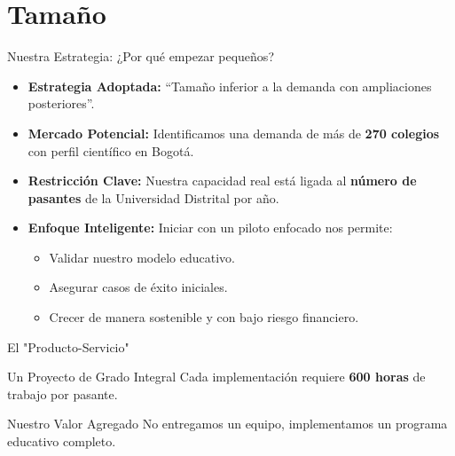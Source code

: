 \section{Tamaño}

\begin{frame}{Nuestra Estrategia: ¿Por qué empezar pequeños?}
    \begin{itemize}
        \item \textbf{Estrategia Adoptada:} ``Tamaño inferior a la demanda con ampliaciones posteriores''.
        \item \textbf{Mercado Potencial:} Identificamos una demanda de más de \textbf{270 colegios} con perfil científico en Bogotá.
        \item \textbf{Restricción Clave:} Nuestra capacidad real está ligada al \textbf{número de pasantes} de la Universidad Distrital por año.
        \item \textbf{Enfoque Inteligente:} Iniciar con un piloto enfocado nos permite:
        \begin{itemize}
            \item Validar nuestro modelo educativo.
            \item Asegurar casos de éxito iniciales.
            \item Crecer de manera sostenible y con bajo riesgo financiero.
        \end{itemize}
    \end{itemize}
\end{frame}

\begin{frame}{El "Producto-Servicio"}
    \begin{block}{Un Proyecto de Grado Integral}
        Cada implementación requiere \textbf{600 horas} de trabajo por pasante.
    \end{block}
    
    \vfill
    \begin{alertblock}{Nuestro Valor Agregado}
        No entregamos un equipo, implementamos un programa educativo completo.
    \end{alertblock}
\end{frame}

